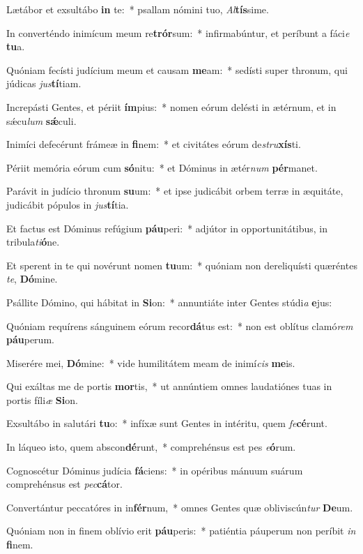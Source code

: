 \item Lætábor et exsultábo \textbf{in} te:~* psallam nómini tuo, \textit{Al}\textbf{tís}sime.
\item In converténdo inimícum meum re\textbf{trór}sum:~* infirmabúntur, et períbunt a fáci\textit{e} \textbf{tu}a.
\item Quóniam fecísti judícium meum et causam \textbf{me}am:~* sedísti super thronum, qui júdicas \textit{jus}\textbf{tí}tiam.
\item Increpásti Gentes, et périit \textbf{ím}pius:~* nomen eórum delésti in ætérnum, et in sǽcu\textit{lum} \textbf{sǽ}culi.
\item Inimíci defecérunt frámeæ in \textbf{fi}nem:~* et civitátes eórum de\textit{stru}\textbf{xís}ti.
\item Périit memória eórum cum \textbf{só}nitu:~* et Dóminus in ætér\textit{num} \textbf{pér}manet.
\item Parávit in judício thronum \textbf{su}um:~* et ipse judicábit orbem terræ in æquitáte, judicábit pópulos in \textit{jus}\textbf{tí}tia.
\item Et factus est Dóminus refúgium \textbf{páu}peri:~* adjútor in opportunitátibus, in tribula\textit{ti}\textbf{ó}ne.
\item Et sperent in te qui novérunt nomen \textbf{tu}um:~* quóniam non dereliquísti quæréntes \textit{te}, \textbf{Dó}mine.
\item Psállite Dómino, qui hábitat in \textbf{Si}on:~* annuntiáte inter Gentes stúdi\textit{a} \textbf{e}jus:
\item Quóniam requírens sánguinem eórum recor\textbf{dá}tus est:~* non est oblítus clamó\textit{rem} \textbf{páu}perum.
\item Miserére mei, \textbf{Dó}mine:~* vide humilitátem meam de inimí\textit{cis} \textbf{me}is.
\item Qui exáltas me de portis \textbf{mor}tis,~* ut annúntiem omnes laudatiónes tuas in portis fíli\textit{æ} \textbf{Si}on.
\item Exsultábo in salutári \textbf{tu}o:~* infíxæ sunt Gentes in intéritu, quem \textit{fe}\textbf{cé}runt.
\item In láqueo isto, quem abscon\textbf{dé}runt,~* comprehénsus est pes \textit{e}\textbf{ó}rum.
\item Cognoscétur Dóminus judícia \textbf{fá}ciens:~* in opéribus mánuum suárum comprehénsus est \textit{pec}\textbf{cá}tor.
\item Convertántur peccatóres in in\textbf{fér}num,~* omnes Gentes quæ obliviscún\textit{tur} \textbf{De}um.
\item Quóniam non in finem oblívio erit \textbf{páu}peris:~* patiéntia páuperum non períbit \textit{in} \textbf{fi}nem.
